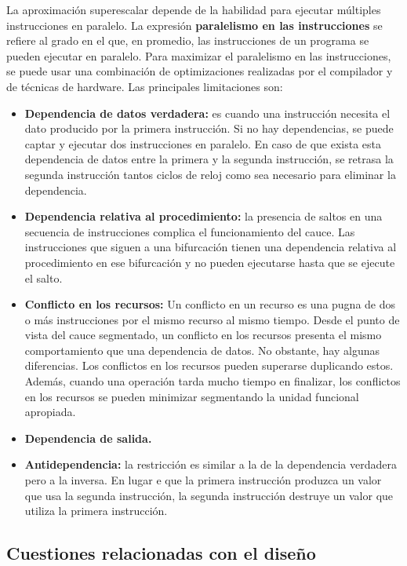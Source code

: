 La aproximación superescalar depende de la habilidad para ejecutar múltiples instrucciones en paralelo. La expresión \textbf{paralelismo en las instrucciones} se refiere al grado en el que, en promedio, las instrucciones de un programa se pueden ejecutar en paralelo. Para maximizar el paralelismo en las instrucciones, se puede usar una combinación de optimizaciones realizadas por el compilador y de técnicas de hardware. Las principales limitaciones son:

\begin{itemize}
  \item \textbf{Dependencia de datos verdadera:} es cuando una instrucción necesita el dato producido por la primera instrucción. Si no hay dependencias, se puede captar y ejecutar dos instrucciones en paralelo. En caso de que exista esta dependencia de datos entre la primera y la segunda instrucción, se retrasa la segunda instrucción tantos ciclos de reloj como sea necesario para eliminar la dependencia.
  \item \textbf{Dependencia relativa al procedimiento:} la presencia de saltos en una secuencia de instrucciones complica el funcionamiento del cauce. Las instrucciones que siguen a una bifurcación tienen una dependencia relativa al procedimiento en ese bifurcación y no pueden ejecutarse hasta que se ejecute el salto.
  \item \textbf{Conflicto en los recursos:} Un conflicto en un recurso es una pugna de dos o más instrucciones por el mismo recurso al mismo tiempo. Desde el punto de vista del cauce segmentado, un conflicto en los recursos presenta el mismo comportamiento que una dependencia de datos. No obstante, hay algunas diferencias. Los conflictos en los recursos pueden superarse duplicando estos. Además, cuando una operación tarda mucho tiempo en finalizar, los conflictos en los recursos se pueden minimizar segmentando la unidad funcional apropiada.
  \item \textbf{Dependencia de salida.}
  \item \textbf{Antidependencia:} la restricción es similar a la de la dependencia verdadera pero a la inversa. En lugar e que la primera instrucción produzca un valor que usa la segunda instrucción, la segunda instrucción destruye un valor que utiliza la primera instrucción.
\end{itemize}

\subsection{Cuestiones relacionadas con el diseño}

